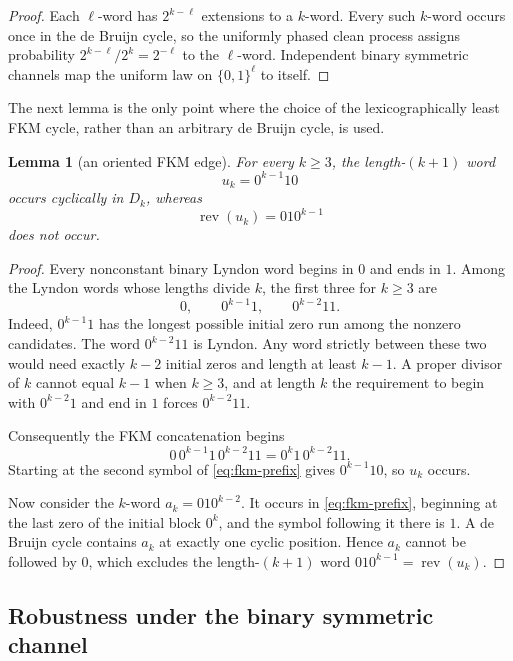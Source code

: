 \documentclass[11pt,a4paper]{amsart}
\newtheorem{lemma}[theorem]{Lemma}
\theoremstyle{definition}
\theoremstyle{remark}
\newcommand{\rev}{\operatorname{rev}}
\begin{document}
\begin{proof}
Each $\ell$-word has $2^{k-\ell}$ extensions to a $k$-word.  Every such
$k$-word occurs once in the de Bruijn cycle, so the uniformly phased clean
process assigns probability
$2^{k-\ell}/2^k=2^{-\ell}$ to the $\ell$-word.  Independent binary
symmetric channels map the uniform law on $\{0,1\}^{\ell}$ to itself.
\end{proof}

The next lemma is the only point where the choice of the lexicographically
least FKM cycle, rather than an arbitrary de Bruijn cycle, is used.

\begin{lemma}[an oriented FKM edge]\label{lem:witness}
For every $k\geq3$, the length-$(k+1)$ word
\[
 u_k=0^{k-1}10
\]
occurs cyclically in $D_k$, whereas
\[
 \rev(u_k)=010^{k-1}
\]
does not occur.
\end{lemma}

\begin{proof}
Every nonconstant binary Lyndon word begins in $0$ and ends in $1$.  Among
the Lyndon words whose lengths divide $k$, the first three for $k\geq3$ are
\[
 0,\qquad 0^{k-1}1,\qquad 0^{k-2}11.
\]
Indeed, $0^{k-1}1$ has the longest possible initial zero run among the
nonzero candidates.  The word $0^{k-2}11$ is Lyndon.  Any word strictly
between these two would need exactly $k-2$ initial zeros and length at least
$k-1$.  A proper divisor of $k$ cannot equal $k-1$ when $k\geq3$, and at
length $k$ the requirement to begin with $0^{k-2}1$ and end in $1$ forces
$0^{k-2}11$.

Consequently the FKM concatenation begins
\begin{equation}\label{eq:fkm-prefix}
 0\,0^{k-1}1\,0^{k-2}11
 =0^k1\,0^{k-2}11.
\end{equation}
Starting at the second symbol of \eqref{eq:fkm-prefix} gives
$0^{k-1}10$, so $u_k$ occurs.

Now consider the $k$-word $a_k=010^{k-2}$.  It occurs in
\eqref{eq:fkm-prefix}, beginning at the last zero of the initial block
$0^k$, and the symbol following it there is $1$.  A de Bruijn cycle contains
$a_k$ at exactly one cyclic position.  Hence $a_k$ cannot be followed by
$0$, which excludes the length-$(k+1)$ word
$010^{k-1}=\rev(u_k)$.
\end{proof}

\subsection{Robustness under the binary symmetric channel}
\end{document}
